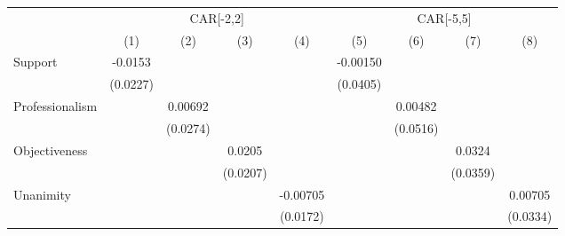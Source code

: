 {
\def\sym#1{\ifmmode^{#1}\else\(^{#1}\)\fi}
\begin{tabular}{l*{8}{c}}
\toprule
                    &\multicolumn{4}{c}{CAR[-2,2]}                                                          &\multicolumn{4}{c}{CAR[-5,5]}                                                          \\\cmidrule(lr){2-5}\cmidrule(lr){6-9}
                    &\multicolumn{1}{c}{(1)}         &\multicolumn{1}{c}{(2)}         &\multicolumn{1}{c}{(3)}         &\multicolumn{1}{c}{(4)}         &\multicolumn{1}{c}{(5)}         &\multicolumn{1}{c}{(6)}         &\multicolumn{1}{c}{(7)}         &\multicolumn{1}{c}{(8)}         \\
\midrule
Support             &     -0.0153         &                     &                     &                     &    -0.00150         &                     &                     &                     \\
                    &    (0.0227)         &                     &                     &                     &    (0.0405)         &                     &                     &                     \\
Professionalism     &                     &     0.00692         &                     &                     &                     &     0.00482         &                     &                     \\
                    &                     &    (0.0274)         &                     &                     &                     &    (0.0516)         &                     &                     \\
Objectiveness       &                     &                     &      0.0205         &                     &                     &                     &      0.0324         &                     \\
                    &                     &                     &    (0.0207)         &                     &                     &                     &    (0.0359)         &                     \\
Unanimity           &                     &                     &                     &    -0.00705         &                     &                     &                     &     0.00705         \\
                    &                     &                     &                     &    (0.0172)         &                     &                     &                     &    (0.0334)         \\

\end{tabular}}
